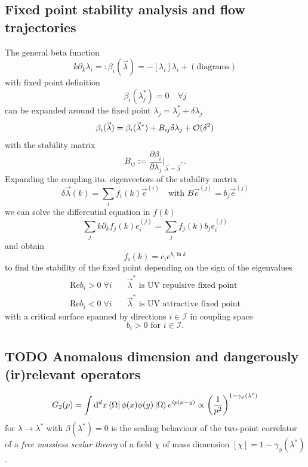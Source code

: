 \subsection{Fixed point stability analysis and flow trajectories}
The general beta function
\begin{equation}
	k\partial_k \lambda_i =: \beta_i (\vec{\lambda}) = - [\lambda_i] \lambda_i + (\text{diagrams})
\end{equation}
with fixed point definition
\begin{equation}
	\beta_i(\lambda^*_j) = 0 \quad \forall j
\end{equation}
can be expanded around the fixed point $\lambda_j=\lambda^*_j+\delta \lambda_j$
\begin{equation}
	\beta_i(\vec{\lambda}) = \beta_i(\vec{\lambda}^*)+B_{ij} \delta \lambda_j + \mathcal{O}(\delta^2)
\end{equation}
with the stability matrix
\begin{equation}
	B_{ij} := \frac{\partial \beta_i}{\partial \lambda_j} |_{\vec{\lambda}=\vec{\lambda}^*}.
\end{equation}
Expanding the coupling ito. eigenvectors of the stability matrix
\begin{equation}
	\delta \vec{\lambda}(k) = \sum_i f_i(k) \vec{e}^{(i)} \quad \text{with } B\vec{e}^{(j)} =b_j \vec{e}^{(j)}
\end{equation}
we can solve the differential equation in $f(k)$
\begin{equation}
	\sum_j k \partial_k f_j(k) e^{(j)}_i = \sum_j f_j(k)b_j e^{(j)}_i
\end{equation}
and obtain
\begin{equation}
	f_i(k)=c_i e^{b_i \ln k}
\end{equation}
to find the stability of the fixed point depending on the sign of the eigenvalues
\begin{align}
	\mathrm{Re}b_i>0 \; \forall i& \quad \vec{\lambda}^* \text{ is UV repulsive fixed point}\\
	\mathrm{Re}b_i<0 \;\forall i&\quad \vec{\lambda}^* \text{ is UV attractive fixed point}
\end{align}
with a critical surface spanned by directions $i\in \mathcal{I}$ in coupling space
\begin{equation}
	b_i >0 \text{ for } i\in \mathcal{I}.
\end{equation}
\subsection{TODO Anomalous dimension and dangerously (ir)relevant operators}
\begin{equation}
G_2(p) = \int \mathrm{d}^d x \bra{\Omega}\phi(x) \phi(y) \ket{\Omega} e^{ip(x-y)}\propto \left(\frac{1}{p^2}\right)^{1-\gamma_\phi(\lambda^*)}
\end{equation}
for $\lambda\rightarrow\lambda^*$ with $\beta(\lambda^*)=0$ is the scaling behaviour of the two-point correlator of a \emph{free massless scalar theory} of a field $\chi$ of mass dimension $[\chi]=1-\gamma_{\phi}(\lambda^*)$.
